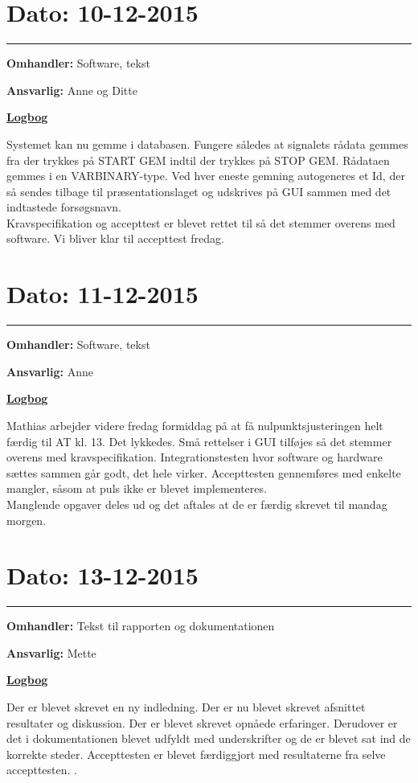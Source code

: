 \section{Dato: 10-12-2015}
\hrule
\textbf{Omhandler:} Software, tekst

\textbf{Ansvarlig:} Anne og Ditte

\underline{\textbf{Logbog}}

Systemet kan nu gemme i databasen. Fungere således at signalets rådata gemmes fra der trykkes på START GEM indtil der trykkes på STOP GEM. Rådataen gemmes i en VARBINARY-type. Ved hver eneste gemning autogeneres et Id, der så sendes tilbage til præsentationslaget og udskrives på GUI sammen med det indtastede forsøgsnavn. \\
Kravspecifikation og accepttest er blevet rettet til så det stemmer overens med software. Vi bliver klar til accepttest fredag.
\\

\section{Dato: 11-12-2015}
\hrule
\textbf{Omhandler:} Software, tekst

\textbf{Ansvarlig:} Anne 

\underline{\textbf{Logbog}}

Mathias arbejder videre fredag formiddag på at få nulpunktsjusteringen helt færdig til AT kl. 13. Det lykkedes. Små rettelser i GUI tilføjes så det stemmer overens med kravspecifikation. 
Integrationstesten hvor software og hardware sættes sammen går godt, det hele virker. Accepttesten gennemføres med enkelte mangler, såsom at puls ikke er blevet implementeres.\\
Manglende opgaver deles ud og det aftales at de er færdig skrevet til mandag morgen.
\\

\section{Dato: 13-12-2015}
\hrule
\textbf{Omhandler:} Tekst til rapporten og dokumentationen 

\textbf{Ansvarlig:} Mette 

\underline{\textbf{Logbog}}

Der er blevet skrevet en ny indledning. Der er nu blevet skrevet afsnittet resultater og diskussion. Der er blevet skrevet opnåede erfaringer. Derudover er det i dokumentationen blevet udfyldt med underskrifter og de er blevet sat ind de korrekte steder. Accepttesten er blevet færdiggjort med resultaterne fra selve accepttesten. 
.
\\

